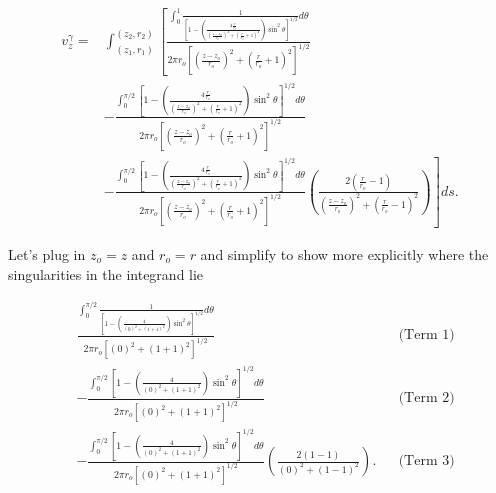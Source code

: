 \begin{equation}
    \begin{split}
        v_{z}^\gamma =&\int_{(z_{1},r_{1})}^{(z_{2},r_{2})}
%
    \left[
    \frac{\int_0^{1}\frac{1}{
    \left[1-\left(\frac{4\frac{r}{r_o}}{\left(\frac{z-z_o}{r_o}\right)^2 + \left(\frac{r}{r_o}+1\right)^2}\right)\sin^2\theta\right]^{1/2}
    }d\theta}
    {2\pi r_o \left[\left(\frac{z-z_o}{r_o}\right)^2 + \left(\frac{r}{r_o}+1\right)^2 \right]^{1/2}} \right. \\
    &-
    \frac{\int_0^{\pi/2}\left[1-\left(\frac{4\frac{r}{r_o}}{\left(\frac{z-z_o}{r_o}\right)^2 + \left(\frac{r}{r_o}+1\right)^2}\right)\sin^2\theta\right]^{1/2}d\theta}{2\pi r_o \left[\left(\frac{z-z_o}{r_o}\right)^2 + \left(\frac{r}{r_o}+1\right)^2 \right]^{1/2}} \\
    &-
    \left. \frac{\int_0^{\pi/2}\left[1-\left(\frac{4\frac{r}{r_o}}{\left(\frac{z-z_o}{r_o}\right)^2 + \left(\frac{r}{r_o}+1\right)^2}\right)\sin^2\theta\right]^{1/2}d\theta}{2\pi r_o \left[\left(\frac{z-z_o}{r_o}\right)^2 + \left(\frac{r}{r_o}+1\right)^2 \right]^{1/2}}
    \left(\frac{2 \left(\frac{r}{r_o}-1\right)}{\left(\frac{z-z_o}{r_o}\right)^2 + \left(\frac{r}{r_o}-1\right)^2}\right) \right] ds.
    \end{split}
\end{equation}


Let's plug in \(z_o = z\) and \(r_o = r\) and simplify to show more explicitly where the singularities in the integrand lie

\begin{equation}
    \begin{aligned}
&
    \frac{\int_0^{\pi/2}\frac{1}{\left[1-\left(\frac{4}{\left(0\right)^2 + \left(1+1\right)^2}\right)\sin^2\theta\right]^{1/2}}d\theta}
        {2\pi r_o \left[\left(0\right)^2 + \left(1+1\right)^2 \right]^{1/2}} &&\text{(Term 1)} \\
&-
        \frac{\int_0^{\pi/2}\left[1-\left(\frac{4}{\left(0\right)^2 + \left(1+1\right)^2}\right)\sin^2\theta\right]^{1/2}d\theta}{2\pi r_o \left[\left(0\right)^2 + \left(1+1\right)^2 \right]^{1/2}} &&\text{(Term 2)}\\
&-
    \frac{\int_0^{\pi/2}\left[1-\left(\frac{4}{\left(0\right)^2 + \left(1+1\right)^2}\right)\sin^2\theta\right]^{1/2}d\theta}{2\pi r_o \left[\left(0\right)^2 + \left(1+1\right)^2 \right]^{1/2}}
        \left(\frac{2 \left(1 - 1\right)}{\left(0\right)^2 + \left(1-1\right)^2}\right). && \text{(Term 3)}
\end{aligned}
\end{equation}

